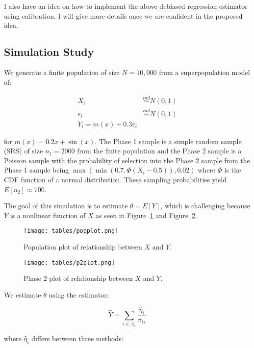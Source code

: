 \documentclass[12pt]{article}
\begin{document}
I also have an idea on how to implement the above debiased regression estimator
using calibration. I will give more details once we are confident in the
proposed idea. 

\subsection{Simulation Study}

We generate a finite population of size $N = 10,000$ from a superpopulation
model of:

$$\begin{aligned}
X_i &\stackrel{ind}{\sim} N(0, 1) \\
\varepsilon_i &\stackrel{ind}{\sim} N(0, 1) \\
Y_i = m(x) + 0.3 \varepsilon_i
\end{aligned}
$$

for $m(x) = 0.2 x + \sin(x)$.
The Phase 1 sample is a simple random sample (SRS) of size $n_1 = 2000$
from the finite population and the Phase 2 sample is a Poisson sample with the
probability of selection into the Phase 2 sample from the Phase 1 sample being
$\max(\min(0.7, \Phi(X_i - 0.5)), 0.02)$ where $\Phi$ is the CDF function of a
normal distribution. These sampling probabilities yield $E[n_2] \approx 700$.

The goal of this simulation is to estimate $\theta = E[Y]$, which is challenging
because $Y$ is a nonlinear function of $X$ as seen in Figure~\ref{fig:popplot}
and Figure~\ref{fig:p2plot}.

\begin{figure}[ht!]
  \centering
  \texttt{[image: tables/popplot.png]}
  \caption{Population plot of relationship between $X$ and $Y$.}
  \label{fig:popplot}
\end{figure}

\begin{figure}[ht!]
  \centering
  \texttt{[image: tables/p2plot.png]}
  \caption{Phase 2 plot of relationship between $X$ and $Y$.}
  \label{fig:p2plot}
\end{figure}

We estimate $\theta$ using the estimator:

$$\hat Y = \sum_{i \in A_1} \frac{\hat \eta_i}{\pi_{1i}}$$

where $\hat \eta_i$ differs between three methods:
\end{document}
